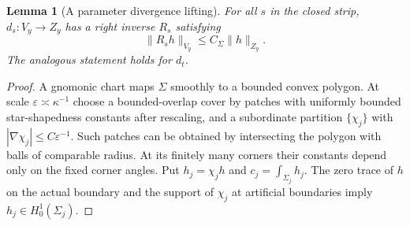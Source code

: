 \documentclass[11pt,a4paper]{article}
\newtheorem{lemma}[theorem]{Lemma}
\theoremstyle{remark}
\numberwithin{equation}{section}
\begin{document}
\begin{lemma}[A parameter divergence lifting]\label{lem:g-paramlift}
For all $s$ in the closed strip, $d_s:V_y\to Z_y$ has a right inverse
$R_s$ satisfying
\[
 \|R_sh\|_{V_y}\le C_\Sigma\|h\|_{Z_y}.
\]
The analogous statement holds for $d_t$.
\end{lemma}
\begin{proof}
A gnomonic chart maps $\Sigma$ smoothly to a bounded convex polygon. At scale
$\varepsilon\asymp\kappa^{-1}$ choose a bounded-overlap cover by patches
with uniformly bounded star-shapedness constants after rescaling, and a
subordinate partition $\{\chi_j\}$ with
$|\nabla\chi_j|\le C\varepsilon^{-1}$. Such patches can be obtained by
intersecting the polygon with balls of comparable radius. At its finitely many
corners their constants depend only on the fixed corner angles. Put
$h_j=\chi_jh$ and $c_j=\int_{\Sigma_j}h_j$. The zero trace of $h$ on the
actual boundary and the support of $\chi_j$ at artificial boundaries imply
$h_j\in H^1_0(\Sigma_j)$.


\end{proof}
\end{document}
